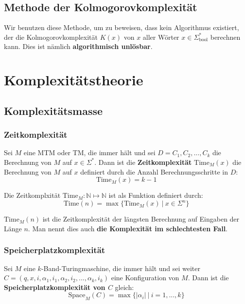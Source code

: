 \documentclass[11pt]{article}
\newcommand{\ttc}{\text{Time}}
\newcommand{\tsc}{\text{Space}}
\begin{document}
\subsection{Methode der Kolmogorovkomplexität}

Wir benutzen diese Methode, um zu beweisen, dass kein Algorithmus existiert, der die Kolmogorovkomplexität $K(x)$ von $x$ aller Wörter $x \in \Sigma^*_\text{bool}$ berechnen kann. Dies ist nämlich \textbf{algorithmisch unlösbar}.

\section{Komplexitätstheorie}

\subsection{Komplexitätsmasse}

\subsubsection{Zeitkomplexität}

Sei $M$ eine MTM oder TM, die immer hält und sei $D = C_1,C_2,...,C_k$ die Berechnung von $M$ auf $x \in \Sigma^*$. Dann ist die \textbf{Zeitkomplexität} $\ttc_M(x)$ die Berechnung von $M$ auf $x$ definiert durch die Anzahl Berechnungsschritte in $D$:
\begin{equation*}
	\ttc_M(x) = k-1
\end{equation*}

Die Zeitkomplxität $\ttc_M: \mathbb{N} \mapsto \mathbb{N}$ ist als Funktion definiert durch:
\begin{equation*}
	\ttc(n) = \max\{\ttc_M(x)\ |\ x \in \Sigma^n\}
\end{equation*}

$\ttc_M(n)$ ist die Zeitkomplexität der längsten Berechnung auf Eingaben der Länge $n$. Man nennt dies auch \textbf{die Komplexität im schlechtesten Fall}.

\subsubsection{Speicherplatzkomplexität}

Sei $M$ eine $k$-Band-Turingmaschine, die immer hält und sei weiter $C = (q, x, i, \alpha_1, i_1, \alpha_2, i_2,..., \alpha_k, i_k)$ eine Konfiguration von $M$. Dann ist die \textbf{Speicherplatzkomplexität von $C$} gleich:
\begin{equation*}
	\tsc_M(C) = \max\{|\alpha_i|\ |\ i = 1,...,k\}
\end{equation*}
\end{document}
